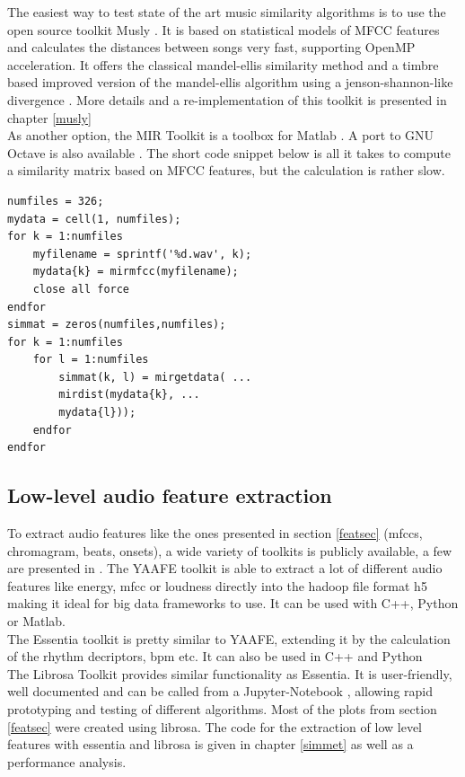 The easiest way to test state of the art music similarity algorithms is to use the open source toolkit Musly \cite{musly1}. It is based on statistical models of MFCC features and calculates the distances between songs very fast, supporting OpenMP acceleration. It offers the classical mandel-ellis similarity method \cite{mandelellis1} and a timbre based improved version of the mandel-ellis algorithm using a jenson-shannon-like divergence \cite{musly2}. More details and a re-implementation of this toolkit is presented in chapter \ref{musly}\\
As another option, the MIR Toolkit \cite{mirtoolbox1} is a toolbox for Matlab \cite{matl1}. A port to GNU Octave \cite{octave1} is also available \cite{mirtoolbox2}. The short code snippet below is all it takes to compute a similarity matrix based on MFCC features, but the calculation is rather slow.

\lstset{language=Matlab}          %
\FloatBarrier
\begin{lstlisting}[frame=single]  % Start your code-block
numfiles = 326;
mydata = cell(1, numfiles);
for k = 1:numfiles
	myfilename = sprintf('%d.wav', k);
	mydata{k} = mirmfcc(myfilename);
	close all force
endfor
simmat = zeros(numfiles,numfiles);
for k = 1:numfiles
	for l = 1:numfiles
		simmat(k, l) = mirgetdata( ...
		mirdist(mydata{k}, ...
		mydata{l}));
	endfor
endfor
\end{lstlisting}
\FloatBarrier

\subsection{Low-level audio feature extraction}
To extract audio features like the ones presented in section \ref{featsec} (mfccs, chromagram, beats, onsets), a wide variety of toolkits is publicly available, a few are presented in \cite{audiofeattoolb}.
The YAAFE toolkit \cite{yaafe1} is able to extract a lot of different audio features like energy, mfcc or loudness directly into the hadoop file format h5 making it ideal for big data frameworks to use. It can be used with C++, Python or Matlab.\\
The Essentia toolkit \cite{essentia1} is pretty similar to YAAFE, extending it by the calculation of the rhythm decriptors, bpm etc. It can also be used in C++ and Python\\
The Librosa Toolkit provides similar functionality \cite{labrosa1} as Essentia. It is user-friendly, well documented and can be called from a Jupyter-Notebook \cite{jupyter}, allowing rapid prototyping and testing of different algorithms. Most of the plots from section \ref{featsec} were created using librosa. The code for the extraction of low level features with essentia and librosa is given in chapter \ref{simmet} as well as a performance analysis.\\


